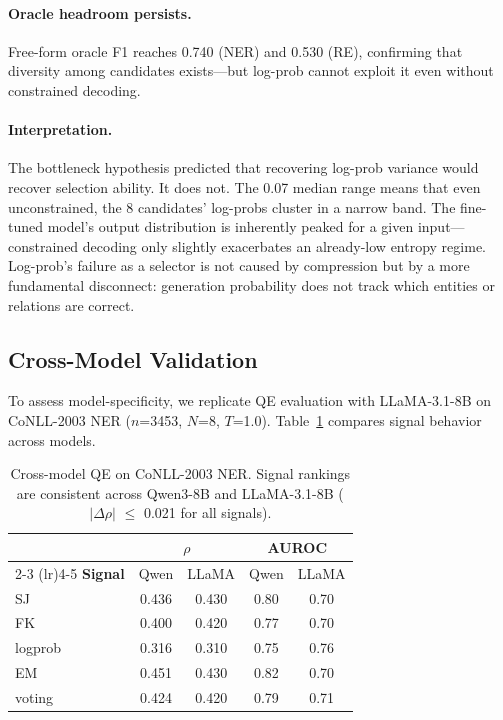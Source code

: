 \documentclass[11pt,a4paper]{article}
\begin{document}
\paragraph{Oracle headroom persists.} Free-form oracle F1 reaches 0.740 (NER) and 0.530 (RE), confirming that diversity among candidates exists---but log-prob cannot exploit it even without constrained decoding.

\paragraph{Interpretation.} The bottleneck hypothesis predicted that recovering log-prob variance would recover selection ability. It does not. The 0.07 median range means that even unconstrained, the 8 candidates' log-probs cluster in a narrow band. The fine-tuned model's output distribution is inherently peaked for a given input---constrained decoding only slightly exacerbates an already-low entropy regime. Log-prob's failure as a selector is not caused by compression but by a more fundamental disconnect: generation probability does not track which entities or relations are correct.

\subsection{Cross-Model Validation}
\label{sec:crossmodel}

To assess model-specificity, we replicate QE evaluation with LLaMA-3.1-8B on CoNLL-2003 NER ($n$=3453, $N$=8, $T$=1.0). Table~\ref{tab:crossmodel} compares signal behavior across models.

\begin{table}[t]
\centering
\small
\begin{tabular}{l cc cc}
\toprule
& \multicolumn{2}{c}{$\rho$} & \multicolumn{2}{c}{AUROC} \\
\cmidrule(lr){2-3} \cmidrule(lr){4-5}
\textbf{Signal} & Qwen & LLaMA & Qwen & LLaMA \\
\midrule
SJ         & 0.436 & 0.430 & 0.80 & 0.70 \\
FK         & 0.400 & 0.420 & 0.77 & 0.70 \\
logprob    & 0.316 & 0.310 & 0.75 & 0.76 \\
EM         & 0.451 & 0.430 & 0.82 & 0.70 \\
voting     & 0.424 & 0.420 & 0.79 & 0.71 \\
\bottomrule
\end{tabular}
\caption{Cross-model QE on CoNLL-2003 NER. Signal rankings are consistent across Qwen3-8B and LLaMA-3.1-8B ($|\Delta\rho|$ $\leq$ 0.021 for all signals).}
\label{tab:crossmodel}
\end{table}
\end{document}

